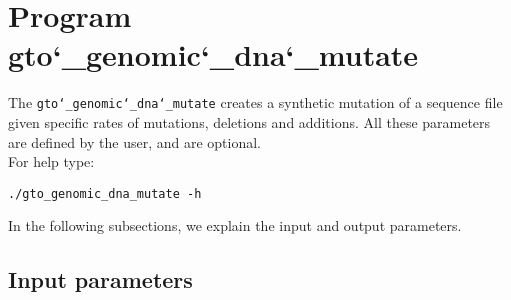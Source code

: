 \section{Program gto\char`_genomic\char`_dna\char`_mutate}
The \texttt{gto\char`_genomic\char`_dna\char`_mutate} creates a synthetic mutation of a sequence file given specific rates of mutations, deletions and additions. All these parameters are defined by the user, and are optional.\\
For help type:
\begin{lstlisting}
./gto_genomic_dna_mutate -h
\end{lstlisting}
In the following subsections, we explain the input and output parameters.

\subsection*{Input parameters}

